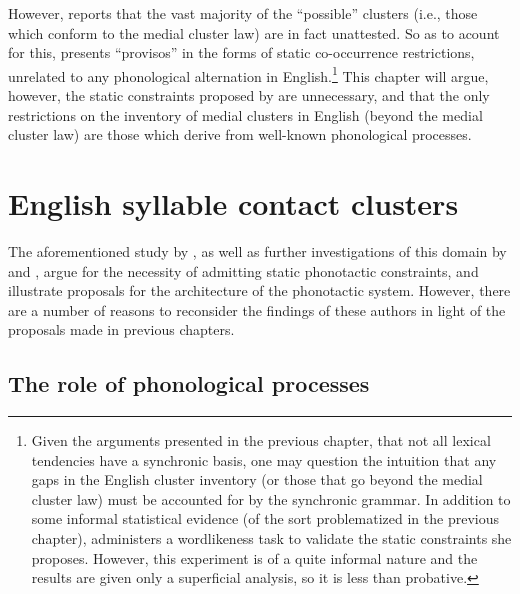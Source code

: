 \noindent
However, \citeauthor{Pierrehumbert1994} reports that the vast majority of the ``possible'' clusters (i.e., those which conform to the medial cluster law) are in fact unattested. 
So as to acount for this, \citeauthor{Pierrehumbert1994} presents ``provisos'' in the forms of static co-occurrence restrictions, unrelated to any phonological alternation in English.\footnote{
    Given the arguments presented in the previous chapter, that not all lexical tendencies have a synchronic basis, one may question the intuition that any gaps in the English cluster inventory (or those that go beyond the medial cluster law) must be accounted for by the synchronic grammar.
    In addition to some informal statistical evidence (of the sort problematized in the previous chapter), \citeauthor{Pierrehumbert1994} administers a wordlikeness task to validate the static constraints she proposes.
    However, this experiment is of a quite informal nature and the results are given only a superficial analysis, so it is less than probative.} 
This chapter will argue, however, the static constraints proposed by \citeauthor{Pierrehumbert1994} are unnecessary, and that the only restrictions on the inventory of medial clusters in English (beyond the medial cluster law) are those which derive from well-known phonological processes.

\section{English syllable contact clusters}

The aforementioned study by \citeauthor{Pierrehumbert1994}, as well as further investigations of this domain by \citet[ chap.~8]{Duanmu2009} and \citet[ chap.~3]{Hammond1999a}, argue for the necessity of admitting static phonotactic constraints, and illustrate proposals for the architecture of the phonotactic system.
However, there are a number of reasons to reconsider the findings of these authors in light of the proposals made in previous chapters.

\subsection{The role of phonological processes}

